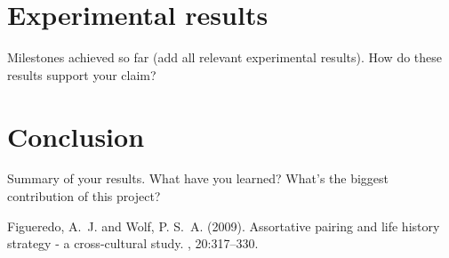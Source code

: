 \documentclass[twoside]{article}
\begin{document}

\section{Experimental results}

Milestones achieved so far (add all relevant experimental results). How do these results support your claim?\\

\lipsum[5] %



\section{Conclusion}

Summary of your results. What have you learned? What’s the biggest contribution of this project?\\

\lipsum[5] %



\begin{thebibliography}{99} %

Figueredo, A.~J. and Wolf, P. S.~A. (2009).
\newblock Assortative pairing and life history strategy - a cross-cultural
  study.
, 20:317--330.
 
\end{thebibliography}

\end{document}
